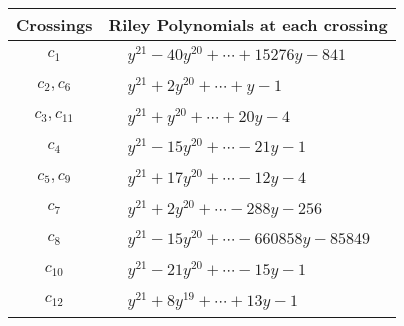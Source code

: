 \documentclass[1p]{elsarticle_modified}
\theoremstyle{definition}
\begin{document}
\begin{tabular}{m{50pt}|m{274pt}}
Crossings & \hspace{64pt}Riley Polynomials at each crossing \\
\hline $$\begin{aligned}c_{1}\end{aligned}$$&$\begin{aligned}
&y^{21}-40 y^{20}+\cdots+15276 y-841
\end{aligned}$\\
\hline $$\begin{aligned}c_{2},c_{6}\end{aligned}$$&$\begin{aligned}
&y^{21}+2 y^{20}+\cdots+y-1
\end{aligned}$\\
\hline $$\begin{aligned}c_{3},c_{11}\end{aligned}$$&$\begin{aligned}
&y^{21}+y^{20}+\cdots+20 y-4
\end{aligned}$\\
\hline $$\begin{aligned}c_{4}\end{aligned}$$&$\begin{aligned}
&y^{21}-15 y^{20}+\cdots-21 y-1
\end{aligned}$\\
\hline $$\begin{aligned}c_{5},c_{9}\end{aligned}$$&$\begin{aligned}
&y^{21}+17 y^{20}+\cdots-12 y-4
\end{aligned}$\\
\hline $$\begin{aligned}c_{7}\end{aligned}$$&$\begin{aligned}
&y^{21}+2 y^{20}+\cdots-288 y-256
\end{aligned}$\\
\hline $$\begin{aligned}c_{8}\end{aligned}$$&$\begin{aligned}
&y^{21}-15 y^{20}+\cdots-660858 y-85849
\end{aligned}$\\
\hline $$\begin{aligned}c_{10}\end{aligned}$$&$\begin{aligned}
&y^{21}-21 y^{20}+\cdots-15 y-1
\end{aligned}$\\
\hline $$\begin{aligned}c_{12}\end{aligned}$$&$\begin{aligned}
&y^{21}+8 y^{19}+\cdots+13 y-1
\end{aligned}$\\
\hline
\end{tabular}\\~\\
\end{document}
